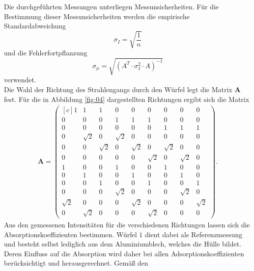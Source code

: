 Die durchgeführten Messungen unterliegen Messunsicherheiten. Für die Bestimmung
dieser Messunsicherheiten werden die empirische Standardabweichung
\begin{equation}
  \sigma_I = \sqrt{\frac{1}{n}}
  \label{eqn:Stdabweichung}
\end{equation}
und die Fehlerfortpflanzung
\begin{equation}
  \sigma_{\mu} = \sqrt{\left(A^T \cdot \sigma_I^2 \cdot A\right)^{-1}}
  \label{eqn:gauß}
\end{equation}
verwendet. \\
\newline
\noindent Die Wahl der Richtung des Strahlengangs durch den Würfel legt die
Matrix $\textbf{A}$ fest. Für die in Abbildung \ref{fig:04} dargestellten
Richtungen ergibt sich die Matrix
\begin{align}
  \textbf{A} = \begin{pmatrix*}[c]
                 1 & 1 & 1 & 0 & 0 & 0 & 0 & 0 & 0 \\
                 0 & 0 & 0 & 1 & 1 & 1 & 0 & 0 & 0 \\
                 0 & 0 & 0 & 0 & 0 & 0 & 1 & 1 & 1 \\
                 0 & \sqrt{2} & 0 & \sqrt{2} & 0 & 0 & 0 & 0 & 0 \\
                 0 & 0 & \sqrt{2} & 0 & \sqrt{2} & 0 & \sqrt{2} & 0 & 0 \\
                 0 & 0 & 0 & 0 & 0 & \sqrt{2} & 0 & \sqrt{2} & 0 \\
                 1 & 0 & 0 & 1 & 0 & 0 & 1 & 0 & 0 \\
                 0 & 1 & 0 & 0 & 1 & 0 & 0 & 1 & 0 \\
                 0 & 0 & 1 & 0 & 0 & 1 & 0 & 0 & 1 \\
                 0 & 0 & 0 & \sqrt{2} & 0 & 0 & 0 & \sqrt{2} & 0 \\
                 \sqrt{2} & 0 & 0 & 0 & \sqrt{2} & 0 & 0 & 0 & \sqrt{2} \\
                 0 & \sqrt{2} & 0 & 0 & 0 & \sqrt{2} & 0 & 0 & 0
               \end{pmatrix*}.
\end{align}
\noindent Aus den gemessenen Intensitäten für die verschiedenen Richtungen
lassen sich die Absorptionskoeffizienten bestimmen. Würfel $1$ dient dabei
als Referenzmessung und besteht selbst lediglich aus dem Aluminiumblech, welches
die Hülle bildet. Deren Einfluss auf die Absorption wird daher bei allen
Adsorptionskoeffizienten berücksichtigt und herausgerechnet. Gemäß den
